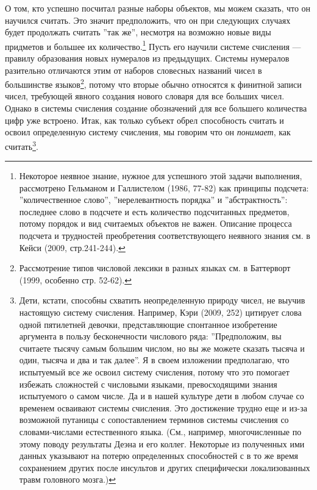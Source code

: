 \documentclass[11pt]{book}
\begin{document}
О том, кто успешно посчитал разные наборы объектов, мы можем сказать, что он научился считать. Это значит предположить, что он при следующих случаях будет продолжать считать ''так же'', несмотря на возможно новые виды придметов и большее их количество.\footnote{Некоторое неявное знание, нужное для успешного этой задачи выполнения, рассмотрено Гельманом и Галлистелом (1986, 77-82) как принципы подсчета: ''количественное слово'', ''нерелевантность порядка'' и ''абстрактность'': последнее слово в подсчете и есть количество подсчитанных предметов, потому порядок и вид считаемых объектов не важен. Описание процесса подсчета и трудностей преобретения соответствующего неявного знания см. в Кейси (2009, стр.241-244).} Пусть его научили системе счисления --- правилу образования новых нумералов из предыдущих. Системы нумералов разительно отличаются этим от наборов словесных названий чисел в большинстве языков\footnote{Рассмотрение типов числовой лексики в разных языках см. в Баттерворт (1999, особенно стр. 52-62).}, потому что вторые обычно относятся к финитной записи чисел, требующей явного создания нового словаря для все больших чисел. Однако в системы счисления создание обозначений для все большего количества цифр уже встроено. Итак, как только субъект обрел способность считать и освоил определенную систему счисления, мы говорим что он \textit{понимает}, как считать\footnote{Дети, кстати, способны схватить неопределенную природу чисел, не выучив настоящую систему счисления. Например, Кэри (2009, 252) цитирует слова одной пятилетней девочки, представляющие спонтанное изобретение аргумента в пользу бесконечности числового ряда: ''Предположим, вы считаете тысячу самым большим числом, но вы же можете сказать тысяча и один, тысяча и два и так далее''. Я в своем изложении предполагаю, что испытуемый все же освоил систему счисления, потому что это помогает избежать сложностей с числовыми языками, превосходящими знания испытуемого о самом числе. Да и в нашей культуре дети в любом случае со временем осваивают системы счисления. Это достижение трудно еще и из-за возможной путаницы с сопоставлением терминов системы счисления со словами-числами естественного языка. (См., например, многочисленные по этому поводу результаты Деэна и его коллег. Некоторые из полученных ими данных указывают на потерю определенных способностей с в то же время сохранением других после инсультов и других специфически локализованных травм головного мозга.)}.
\end{document}
